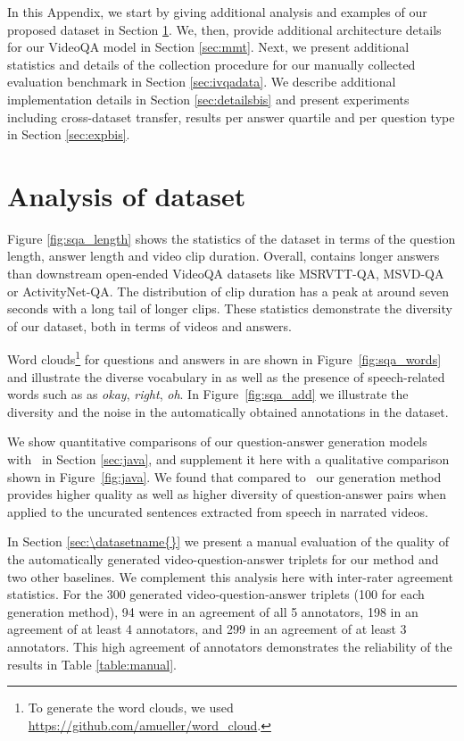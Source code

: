 In this Appendix, we start by giving additional  analysis and examples of our proposed \datasetname{} dataset in Section \ref{sec:sqadata}.
We, then,  provide additional architecture details for our VideoQA model in Section \ref{sec:mmt}.
Next, we present additional statistics and details of the collection procedure for our manually collected \smalldatasetname{} evaluation benchmark in Section \ref{sec:ivqadata}.
We describe additional implementation details in Section \ref{sec:detailsbis} and present experiments including cross-dataset transfer, results per answer quartile and per question type in Section \ref{sec:expbis}.



\section{Analysis of \datasetname{} dataset}
\label{sec:sqadata}

Figure \ref{fig:sqa_length} shows the statistics of the \datasetname{} dataset in terms of the question length, answer length and video clip duration. 
Overall, \datasetname{} contains longer answers than downstream open-ended VideoQA datasets like MSRVTT-QA, MSVD-QA or ActivityNet-QA.
The distribution of clip duration has a peak at around seven seconds with a long tail of longer clips.  These statistics demonstrate the diversity of our \datasetname{} dataset, both in terms of videos and answers.

Word clouds\footnote{To generate the word clouds, we used \url{https://github.com/amueller/word_cloud}.} for questions and answers in \datasetname{} are shown in Figure~\ref{fig:sqa_words} and illustrate the diverse vocabulary in \datasetname{} as well as the presence of speech-related words such as as \textit{okay}, \textit{right}, \textit{oh}. 
In Figure~\ref{fig:sqa_add} we illustrate the diversity and the noise in the automatically obtained annotations in the \datasetname{} dataset.

We show quantitative comparisons of our question-answer generation models with~\cite{heilman2010good} in Section \ref{sec:java}, and supplement it here with a qualitative comparison shown in Figure~\ref{fig:java}. 
We found that compared to~\cite{heilman2010good} our generation method provides higher quality as well as higher diversity of question-answer pairs when applied to the uncurated sentences extracted from speech in narrated videos.


In Section \ref{sec:\datasetname{}} we present a manual evaluation of the quality of the automatically generated video-question-answer triplets for our method and two other baselines. We complement this analysis here with inter-rater agreement statistics.
For the 300 generated video-question-answer triplets (100 for each generation method), 94 were in an agreement of all 5 annotators, 198 in an agreement of at least 4 annotators, and 299 in an agreement of at least 3 annotators. 
This high agreement of annotators demonstrates the reliability of the results in Table \ref{table:manual}. 

